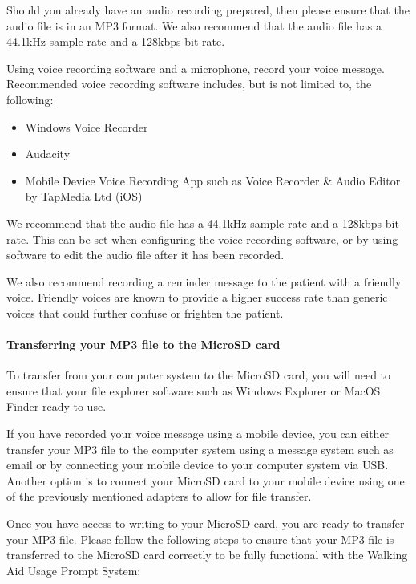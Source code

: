 				Should you already have an audio recording prepared, then please ensure that the audio file is in an MP3 format. We also recommend that the audio file has a 44.1kHz sample rate and a 128kbps bit rate.

				Using voice recording software and a microphone, record your voice message. Recommended voice recording software includes, but is not limited to, the following:

				\begin{itemize}
					\item Windows Voice Recorder
					\item Audacity
					\item Mobile Device Voice Recording App such as Voice Recorder \& Audio Editor by TapMedia Ltd (iOS)
				\end{itemize}

				We recommend that the audio file has a 44.1kHz sample rate and a 128kbps bit rate. This can be set when configuring the voice recording software, or by using software to edit the audio file after it has been recorded.

				We also recommend recording a reminder message to the patient with a friendly voice. Friendly voices are known to provide a higher success rate than generic voices that could further confuse or frighten the patient.

				\paragraph{Transferring your MP3 file to the MicroSD card}\mbox{}

				To transfer from your computer system to the MicroSD card, you will need to ensure that your file explorer software such as Windows Explorer or MacOS Finder ready to use.

				If you have recorded your voice message using a mobile device, you can either transfer your MP3 file to the computer system using a message system such as email or by connecting your mobile device to your computer system via USB. Another option is to connect your MicroSD card to your mobile device using one of the previously mentioned adapters to allow for file transfer.

				Once you have access to writing to your MicroSD card, you are ready to transfer your MP3 file. Please follow the following steps to ensure that your MP3 file is transferred to the MicroSD card correctly to be fully functional with the Walking Aid Usage Prompt System:

